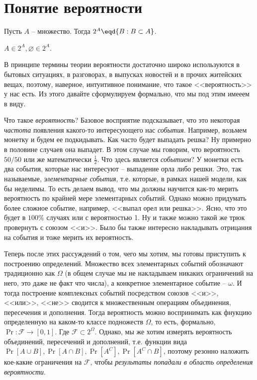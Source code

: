 \section{Понятие вероятности}

\Def Пусть $A$ -- множество. Тогда $2^A \eqd \{ B: B \subset A \}$.

\Note $A \in 2^A, \varnothing \in 2^A$.

В принципе термины теории вероятности достаточно широко используются в бытовых ситуациях, в разговорах, в выпусках новостей и в прочих житейских вещах, поэтому, наверное, интуитивное понимание, что такое <<вероятность>> у нас есть.
Из этого давайте сформулируем формально, что мы под этим имееем в виду.

Что такое \textit{вероятность}? Базовое восприятие подсказывает, что это некоторая \textit{частота} появления какого-то интересующего нас \textit{события}.
Например, возьмем монетку и будем ее подкидывать. Как часто будет выпадать решка? Ну примерно в половине случаев она выпадет. В этом случае мы говорим, что вероятность $50/50$ или же математически $\frac{1}{2}$.
Что здесь является \textit{событием}? У монетки есть два события, которые нас интересуют -- выпадение орла либо решки. Это, так называемые, \textit{элементарные события}, т.е. которые, в рамках нашей модели, как бы неделимы.
То есть делаем вывод, что мы должны научится как-то мерить вероятность по крайней мере элементарных событий. Однако можно придумать более сложное событие, например, <<выпал орел или решка>>.
Ясно, что это будет в $100\%$ случаях или с вероятностью 1. Ну и также можно такой же трюк провернуть с союзом <<и>>. Было бы также интересно накладывать отрицания на события и тоже мерить их вероятность.

Теперь после этих рассуждений о том, чего мы хотим, мы готовы приступить к построению определений. Множество всех элементарных событий обозначают традиционно как $\Omega$ (в общем случае мы не накладываем никаких ограничений на него, это даже не факт что числа), а конкретное элементарное событие -- $\omega$.
И тогда построение комплексных событий посредством союзов <<и>>, <<или>>, <<не>> сводится к множественным операциям объединения, пересечения и дополнения.
Тогда вероятность можно воспринимать как фнукцию определенную на каком-то классе подножеств $\Omega$, то есть, формально, $\Pr: \mathcal{F} \to [0, 1]$. Где $\mathcal{F} \subset 2^\Omega$.
Однако, мы же хотим измерять вероятность объединений, пересечений и дополнений, т.е. функции вида $\Pr[A \cup B], \Pr[A \cap B], \Pr\left[A^C\right], \Pr\left[A^C \cap B\right]$, поэтому резонно наложить кое-какие ограничения на $\mathcal{F}$, чтобы \textit{результаты попадали в область определения вероятности}.


